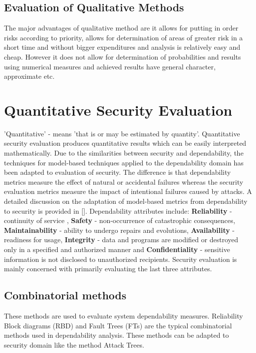 \documentclass[pdftex,english,oribibl]{llncs}
\begin{document}
\subsection{Evaluation of Qualitative Methods}
The major advantages of qualitative method are it allows for putting in order risks according to priority, allows for determination of areas of greater risk in a short time and without bigger expenditures and analysis is relatively easy and cheap. However it does not allow for determination of probabilities and results using numerical measures and achieved results have general character, approximate etc.

\section{Quantitative Security Evaluation}\label{sec:quantitative}
'Quantitative' - means 'that is or may be estimated by quantity'. Quantitative security evaluation produces quantitative results which can be easily interpreted mathematically. Due to the similarities between security and dependability, the techniques for model-based techniques applied to the dependability domain has been adapted to evaluation of security. The difference is that dependability metrics measure the effect of natural or accidental failures whereas the security evaluation metrics measure the impact of intentional failures caused by attacks. A detailed discussion on the adaptation of model-based metrics from dependability to security is provided in [\citealp{1335467_Nicol}]. Dependability attributes include: \textbf{Reliability} - continuity of service , \textbf{Safety} - non-occurrence of catastrophic consequences, \textbf{Maintainability} - ability to undergo repairs and evolutions, \textbf{Availability} - readiness for usage, \textbf{Integrity} - data and programs are modified or destroyed only in a specified and authorized manner and \textbf{Confidentiality} - sensitive information is not disclosed to unauthorized recipients. Security evaluation is mainly concerned with primarily evaluating the last three attributes.

\subsection{Combinatorial methods}
These methods are used to evaluate system dependability measures. Reliability Block diagrams (RBD) and Fault Trees (FTs) are the typical combinatorial methods used in dependability analysis. These methods can be adapted to security domain like the method Attack Trees. 
\end{document}
